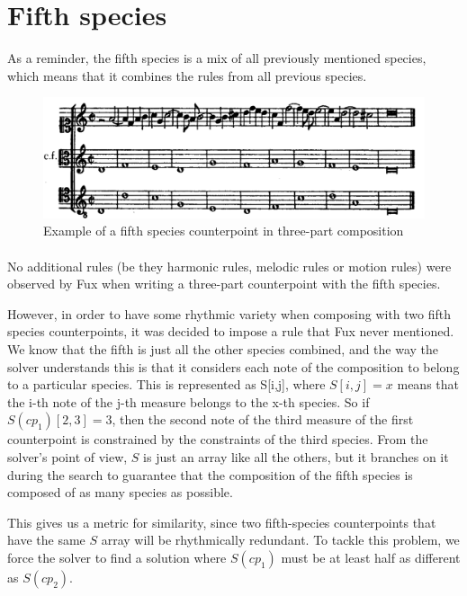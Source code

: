 \section{Fifth species}

As a reminder, the fifth species is a mix of all previously mentioned species, which means that it combines the rules from all previous species.

\begin{figure}[h]
    \centering
    \includegraphics[width=1\textwidth]{Images/Species_examples/5sp-example.png}
    \caption{Example of a fifth species counterpoint in three-part composition}
    \label{fig:example-5sp}
\end{figure}

\paragraph{}
No additional rules (be they harmonic rules, melodic rules or motion rules) were observed by Fux when writing a three-part counterpoint with the fifth species.


However, in order to have some rhythmic variety when composing with two fifth species counterpoints, it was decided to impose a rule that Fux never mentioned. We know that the fifth is just all the other species combined, and the way the solver understands this is that it considers each note of the composition to belong to a particular species. This is represented as S[i,j], where $S[i,j]=x$ means that the i-th note of the j-th measure belongs to the x-th species. So if $S(cp_1)[2, 3]=3$, then the second note of the third measure of the first counterpoint is constrained by the constraints of the third species. From the solver's point of view, $S$ is just an array like all the others, but it branches on it during the search to guarantee that the composition of the fifth species is composed of as many species as possible.

This gives us a metric for similarity, since two fifth-species counterpoints that have the same $S$ array will be rhythmically redundant. To tackle this problem, we force the solver to find a solution where $S(cp_1)$ must be at least half as different as $S(cp_2)$. 

